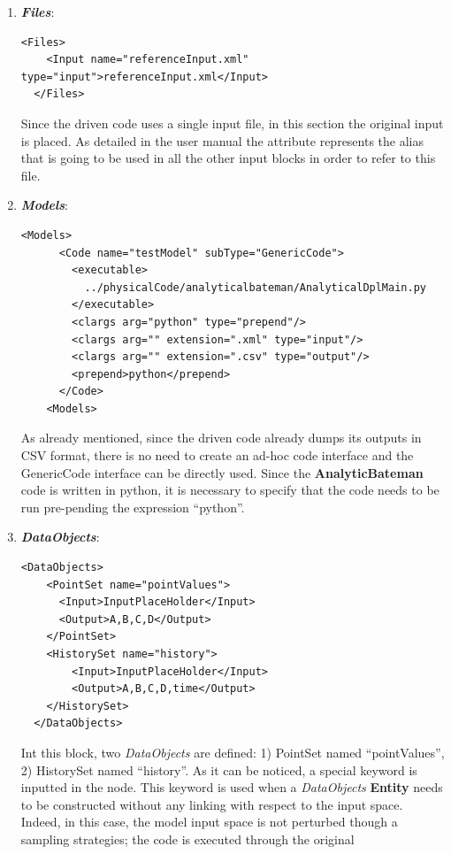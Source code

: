 \begin{enumerate}
   \item \textbf{\textit{Files}}:
\begin{lstlisting}[style=XML,morekeywords={arg,extension,pauseAtEnd,overwrite}]
  <Files>
    <Input name="referenceInput.xml" type="input">referenceInput.xml</Input>
  </Files>
\end{lstlisting}
   Since the driven code uses a single input file, in this section the original input is placed. As detailed in the user manual
   the attribute   represents the alias that is going to be used in all the other input blocks in order to 
   refer to this file.
   \item \textbf{\textit{Models}}:
\begin{lstlisting}[style=XML,morekeywords={arg,extension,pauseAtEnd,overwrite}]
   <Models>
      <Code name="testModel" subType="GenericCode">
        <executable>
          ../physicalCode/analyticalbateman/AnalyticalDplMain.py
        </executable>
        <clargs arg="python" type="prepend"/>
        <clargs arg="" extension=".xml" type="input"/>
        <clargs arg="" extension=".csv" type="output"/>
        <prepend>python</prepend>
      </Code>
    <Models>
\end{lstlisting}
  As already mentioned, since the driven code already dumps its outputs in CSV format, there is no need to create
  an ad-hoc code interface and the GenericCode interface can be directly used. Since the \textbf{AnalyticBateman} code
  is written in python, it is necessary to specify that the code needs to be run pre-pending the expression ``python''. 
   \item \textbf{\textit{DataObjects}}:
\begin{lstlisting}[style=XML,morekeywords={arg,extension,pauseAtEnd,overwrite}]
  <DataObjects>
    <PointSet name="pointValues">
      <Input>InputPlaceHolder</Input>
      <Output>A,B,C,D</Output>
    </PointSet>
    <HistorySet name="history">
        <Input>InputPlaceHolder</Input>
        <Output>A,B,C,D,time</Output>
    </HistorySet>
  </DataObjects>
\end{lstlisting}
  Int this block, two \textit{DataObjects} are defined: 1) PointSet named ``pointValues'', 2) HistorySet named ``history''.
  As it can be noticed, a special keyword is inputted in the  node. This keyword is used when a \textit{DataObjects}  \textbf{Entity} needs to be constructed without any linking with respect to the input space. Indeed, in 
  this case, the model input space is not perturbed though a sampling strategies; the code is executed through the original

\end{enumerate}
